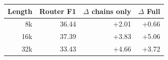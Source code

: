 \begin{tabular}{rrrr}
\toprule
Length & Router F1 & $\Delta$ chains only & $\Delta$ Full \\
\midrule
8k & 36.44 & +2.01 & +0.66 \\
16k & 37.39 & +3.83 & +5.06 \\
32k & 33.43 & +4.66 & +3.72 \\
\bottomrule
\end{tabular}
